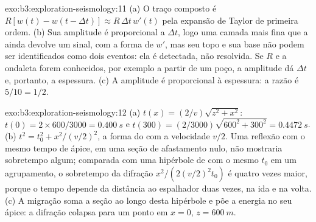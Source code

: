 \begin{solution}{exo:b3:exploration-seismology:11}
(a) O traço composto é $R[w(t) - w(t - \Delta t)] \approx R\,\Delta t\,w'(t)$ pela
expansão de Taylor de primeira ordem. (b) Sua amplitude é proporcional a
$\Delta t$, logo uma camada mais fina que a  ainda devolve um sinal,
com a forma de $w'$, mas seu topo e sua base não podem ser identificados como dois eventos: ela
é detectada, não resolvida. Se $R$ e a ondaleta forem conhecidos, por exemplo a partir de um
poço, a amplitude dá $\Delta t$ e, portanto, a espessura. (c) A amplitude é
proporcional à espessura: a razão é $5/10 = 1/2$.
\end{solution}

\begin{solution}{exo:b3:exploration-seismology:12}
(a) $t(x) = (2/v)\sqrt{z^2 + x^2}$: $t(0) = 2\times600/3000 = \qty{0.400}{s}$ e
$t(300) = (2/3000)\sqrt{600^2 + 300^2} = \qty{0.4472}{s}$. (b) $t^2 = t_0^2 +
x^2/(v/2)^2$, a forma do  com a velocidade $v/2$. Uma reflexão com o mesmo tempo de
ápice, em uma seção de afastamento nulo, não mostraria sobretempo algum; comparada com uma
hipérbole de  com o mesmo $t_0$ em um agrupamento, o sobretempo da difração
$x^2/(2(v/2)^2t_0)$ é quatro vezes maior, porque o tempo depende da
distância ao espalhador duas vezes, na ida e na volta. (c) A migração soma a
seção ao longo desta hipérbole e põe a energia no seu ápice: a difração
colapsa para um ponto em $x = 0$, $z = \qty{600}{m}$.
\end{solution}

